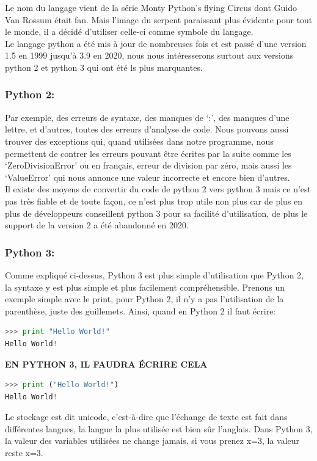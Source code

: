 \documentclass[a4paper, 12pt]{article}
\numberwithin{equation}{subsection}
\begin{document}
Le nom du langage vient de la série Monty Python’s flying Circus dont Guido Van Rossum était fan. Mais l’image du serpent paraissant plus évidente pour tout le monde, il a décidé d'utiliser celle-ci comme symbole du langage.\\

Le langage python a été mis à jour de nombreuses fois et est passé d’une version 1.5 en 1999 jusqu’à 3.9 en 2020, nous nous intéresserons surtout aux versions python 2 et python 3 qui ont été ls plus marquantes.
\subsubsection{Python 2:}
Par exemple, des erreurs de syntaxe, des manques de ‘:’, des manques d’une lettre, et d'autres, toutes des erreurs d’analyse de code. Nous pouvons aussi trouver des exceptions qui, quand utilisées dans notre programme, nous permettent de contrer les erreurs pouvant être écrites par la suite comme les ‘ZeroDivisionError’ ou en français, erreur de division par zéro, mais aussi les ‘ValueError’ qui nous annonce une valeur incorrecte et encore bien d’autres.\\

Il existe des moyens de convertir du code de python 2 vers python 3 mais ce n’est pas très fiable et de toute façon, ce n’est plus trop utile non plus car de plus en plus de développeurs conseillent python 3 pour sa facilité d’utilisation, de plus le support de la version 2 a été abandonné en 2020.
\subsubsection{Python 3:}
Comme expliqué ci-dessus, Python 3 est plus simple d’utilisation que Python 2, la syntaxe y est plus simple et plus facilement compréhensible. Prenons un exemple simple avec le print, pour Python 2, il n’y a pas l’utilisation de la parenthèse, juste des guillemets. Ainsi, quand en Python 2 il faut écrire:\\
\begin{lstlisting}[language=Python]
>>> print "Hello World!"
Hello World!
\end{lstlisting}

\textbf{EN PYTHON 3, IL FAUDRA ÉCRIRE CELA}\\
\begin{lstlisting}[language=Python]
>>> print ("Hello World!")
Hello World!
\end{lstlisting}
Le stockage est dit unicode, c'est-à-dire que l’échange de texte est fait dans différentes langues, la langue la plus utilisée est bien sûr l’anglais. Dans Python 3, la valeur des variables utilisées ne change jamais, si vous prenez x=3, la valeur reste x=3.\\
\end{document}
